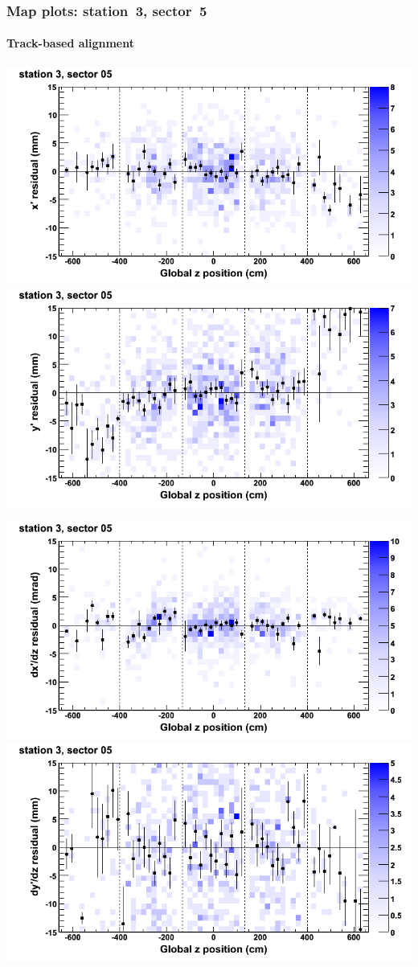 \documentclass[compress]{beamer}
\begin{document}
\begin{frame}
\frametitle{Map plots: station~3, sector~5}
\framesubtitle{Track-based alignment}
\includegraphics[width=0.5\linewidth]{mapplots_re05/DTvsz_st3sec05_x.png}
\includegraphics[width=0.5\linewidth]{mapplots_re05/DTvsz_st3sec05_y.png}

\includegraphics[width=0.5\linewidth]{mapplots_re05/DTvsz_st3sec05_dxdz.png}
\includegraphics[width=0.5\linewidth]{mapplots_re05/DTvsz_st3sec05_dydz.png}
\end{frame}
\end{document}
